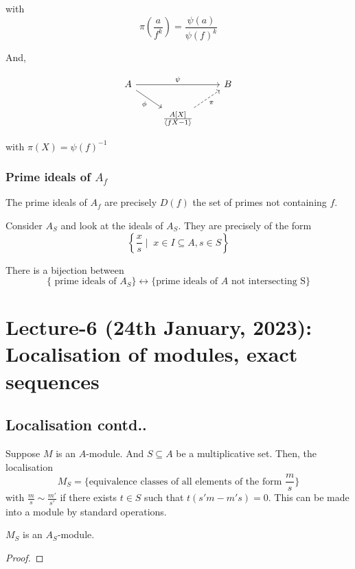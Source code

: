 \documentclass[oneside, 12pt, ]{scrbook}
\theoremstyle{theorem}
\begin{document}
with $$\pi\left( \frac{a}{f^k} \right) = \frac{\psi (a)}{\psi (f)^k}$$

And, 

\[\begin{tikzcd}
	A && B \\
	& {\frac{A[X]}{\langle fX - 1 \rangle}}
	\arrow["\psi", from=1-1, to=1-3]
	\arrow["\phi"', from=1-1, to=2-2]
	\arrow["\pi"', dashed, from=2-2, to=1-3]
\end{tikzcd}\]

with $\pi(X) = \psi(f)^{-1}$ \\

\subsection{Prime ideals of $A_{f}$}

\begin{theorem}
The prime ideals of $A_{f}$ are precisely $D(f)$ the set of primes not containing $f$.
\end{theorem}

Consider $A_{S}$ and look at the ideals of $A_{S}$. They are precisely of the form $$\left \{ \frac{x}{s} \mid \;  x \in I \subseteq A, s  \in S \right\}$$

There is a bijection between $$\{ \text{ prime ideals of } A_{S} \} \leftrightarrow \{ \text{prime ideals of } A \text{ not intersecting S} \}$$


\chapter{Lecture-6 (24th January, 2023): Localisation of modules, exact sequences}

\section{Localisation contd..}

Suppose $M$ is an $A$-module. And $S\subseteq A$ be a multiplicative set. Then, the localisation $$M_{S} = \{\text{equivalence classes of all elements of the form } \frac{m}{s}\}$$ with $\frac{m}{s} \sim \frac{m'}{s'}$ if there exists $t\in S$ such that $t(s'm - m's)=0$. This can be made into a module by standard operations. 

\begin{lemma}
$M_{S}$ is an $A_{S}$-module.
\end{lemma}

\begin{proof}

\end{proof}
\end{document}
